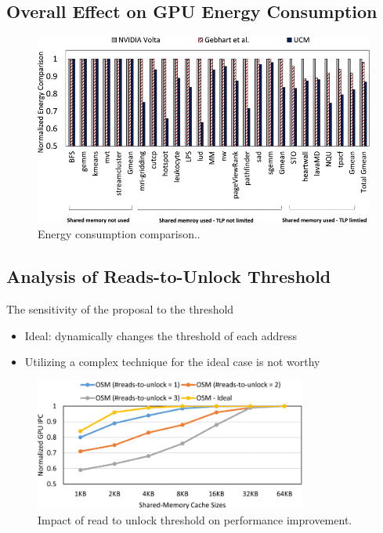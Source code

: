\documentclass[
    fontset=fandol,
    xcolor=svgnames %
]{ctexbeamer}
\begin{document}
\subsection{Overall Effect on GPU Energy Consumption}

\begin{frame}

    \begin{figure}
        \includegraphics[width=1\textwidth]{assets/figure/sadro14-3154315-large.png}
        \caption{Energy consumption comparison..}
    \end{figure}

\end{frame}

\subsection{Analysis of Reads-to-Unlock Threshold}

\begin{frame}

    \begin{block}{The sensitivity of the proposal to the threshold}
        \begin{itemize}
            \item Ideal: dynamically changes the threshold of each address
            \item Utilizing a complex technique for the ideal case is not worthy
        \end{itemize}
    \end{block}

    \begin{figure}
        \includegraphics[width=0.8\textwidth]{assets/figure/sadro15-3154315-large.png}
        \caption{Impact of read to unlock threshold on performance improvement.}
    \end{figure}

\end{frame}
\end{document}
